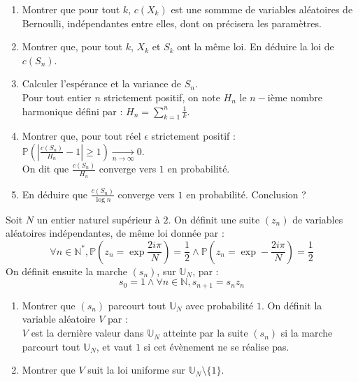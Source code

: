 \begin{exer}
\begin{enumerate}
\medskip
On se fixe maintenant un entier naturel non nul $n$ et on cherche \`a conna\^itre la loi de $S_n$.\\
Soit $(U_k)_{k\in [\![1,n-1]\!]}$ une famille de variables al\'eatoires, ind\'ependantes, respectivement sur les termes de $([\![1,k+1]\!])_k$. Soit $(X_k)$ la suite de variables al\'eatoires, d\'efinie par r\'ecurrence finie sur $k$ par :\\
$X_1$ prend seulement la valeur $Id_{\{1\}}$ ; $\forall k \in [\![1,n-1]\!] , X_{k+1}=\Phi^k(X_k,U_k)$.\\
\item Montrer que pour tout $k$, $c(X_k)$ est une sommme de variables al\'eatoires de Bernoulli, ind\'ependantes entre elles, dont on pr\'ecisera les param\`etres.
\item Montrer que, pour tout $k$, $X_k$ et $S_k$ ont la m\^eme loi. En d\'eduire la loi de $c(S_n)$.
\item Calculer l'esp\'erance et la variance de $S_n$.\\
Pour tout entier $n$ strictement positif, on note $H_n$ le $n-$i\`eme nombre harmonique d\'efini par : $H_n=\sum\limits_{k=1}^{n}\frac{1}{k}$.
\item Montrer que, pour tout r\'eel $\epsilon$ strictement positif : $\mathbb{P}\left(\left|\frac{c(S_n)}{H_n}-1\right|\geq 1\right)\underset{n\rightarrow \infty}{\rightarrow}0$.\\
On dit que $\frac{c(S_n)}{H_n}$ converge vers $1$ en probabilit\'e.
\item En d\'eduire que $\frac{c(S_n)}{\log n}$ converge vers $1$ en probabilit\'e. Conclusion ?
\end{enumerate}
\end{exer}


\begin{exer}
Soit $N$ un entier naturel sup\'erieur \`a $2$. On d\'efinit une suite $(z_n)$ de variables al\'eatoires ind\'ependantes, de même loi donn\'ee par :
\[\forall n \in \mathbb{N}^{\ast}, \mathbb{P}\left(z_n =\exp\frac{2i\pi}{N}\right) = \frac{1}{2} \wedge \mathbb{P}\left(z_n =\exp -\frac{2i\pi}{N}\right) = \frac{1}{2}\]
On d\'efinit ensuite la marche $(s_n)$, sur $\mathbb{U}_N$, par :
\[s_0=1 \wedge \forall n \in \mathbb{N} , s_{n+1}=s_n z_n\]
\ligneinter
\begin{enumerate}
\item Montrer que $(s_n)$ parcourt tout $\mathbb{U}_N$ avec probabilit\'e $1$.
On d\'efinit la variable al\'eatoire $V$ par :\\
$V$ est la derni\`ere valeur dans $\mathbb{U}_N$ atteinte par la suite $(s_n)$ si la marche parcourt tout $\mathbb{U}_N$, %
et vaut $1$ si cet \'ev\`enement ne se r\'ealise pas.
\item Montrer que $V$ suit la loi uniforme sur $\mathbb{U}_N\setminus \{1\}$.
\end{enumerate}
\end{exer}


